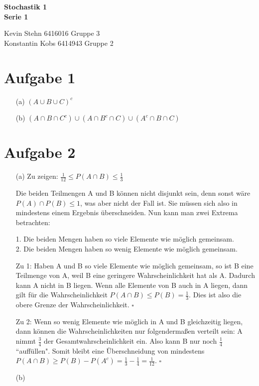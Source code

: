 \documentclass[10pt,a4paper]{article}
\begin{document}
\begin{center}
\textbf{Stochastik 1 \\ Serie 1 \\}
\end{center}

\begin{flushright}
Kevin Stehn 6416016 Gruppe 3 \\
Konstantin Kobs 6414943 Gruppe 2
\end{flushright}

\section*{Aufgabe 1}
\begin{itemize}
\item[(a)] $(A \cup B \cup C)^{c}$
\item[(b)] 
$(A \cap B \cap C^{c}) \cup (A \cap B^{c} \cap C) \cup (A^{c} \cap B \cap C)$
\end{itemize}

\section*{Aufgabe 2}
\begin{itemize}
\item[(a)]
Zu zeigen: $\frac{1}{12} \leq P(A \cap B) \leq \frac{1}{3}$

Die beiden Teilmengen A und B können nicht disjunkt sein, denn sonst wäre $P(A) \cap P(B) \leq 1$, was aber nicht der Fall ist. Sie müssen sich also in mindestens einem Ergebnis überschneiden. Nun kann man zwei Extrema betrachten:

1. Die beiden Mengen haben so viele Elemente wie möglich gemeinsam.\\
2. Die beiden Mengen haben so wenig Elemente wie möglich gemeinsam.

Zu 1: Haben A und B so viele Elemente wie möglich gemeinsam, so ist B eine Teilmenge von A, weil B eine geringere Wahrscheinlichkeit hat als A. Dadurch kann A nicht in B liegen. Wenn alle Elemente von B auch in A liegen, dann gilt für die Wahrscheinlichkeit $P(A \cap B) \leq P(B) = \frac{1}{3}$. Dies ist also die obere Grenze der Wahrscheinlichkeit. $\square$

Zu 2: Wenn so wenig Elemente wie möglich in A und B gleichzeitig liegen, dann können die Wahrscheinlichkeiten nur folgendermaßen verteilt sein:
A nimmt $\frac{3}{4}$ der Gesamtwahrscheinlichkeit ein. Also kann B nur noch $\frac{1}{4}$ ``auffüllen". Somit bleibt eine Überschneidung von mindestens $P(A \cap B) \geq P(B) - P(A^c) = \frac{1}{3} - \frac{1}{4} = \frac{1}{12}$. $\square$

\item[(b)]
\end{itemize}
\end{document}
